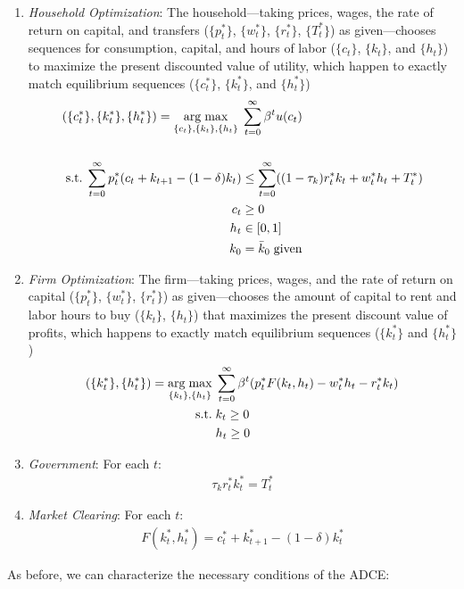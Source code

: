 \documentclass[12pt]{article}
\theoremstyle{plain}
\theoremstyle{definition}
\theoremstyle{remark}
\DeclareMathOperator*{\argmax}{arg\;max}
\newcommand{\sumtinfz}{\sum^\infty_{t=0}}
\begin{document}
\begin{enumerate}
  \item \emph{Household Optimization}: The household---taking prices,
    wages, the rate of return on capital, and transfers
    ($\{p^*_t\}$, $\{w^*_t\}$, $\{r^*_t\}$, $\{T_t^*\}$) as
    given---chooses sequences for consumption, capital, and hours of
    labor
    ($\{c_t\}$, $\{k_t\}$, and $\{h_t\}$)
    to maximize the present discounted value of utility, which happen to
    exactly match equilibrium sequences
    ($\{c_t^*\}$, $\{k_t^*\}$, and $\{h_t^*\}$)
    \begin{align}
      (\{c_t^*\}, \{k_t^*\}, \{h_t^*\})
      =
      \argmax_{\{c_t\}, \{k_t\}, \{h_t\}}
        \; &\sumtinfz \beta^t u(c_t)
        \label{defn:adce-hh-objfcn-taxes}\\\notag\\
      \text{s.t.} \;
        \sumtinfz p^*_t(c_t + k_{t+1}-(1-\delta)k_t) &\leq
        \sumtinfz ((1-\tau_k)r^*_t k_t + w^*_t h_t + T^*_t)
        \label{defn:adce-hh-budget-taxes}\\
      c_t &\geq 0 \notag\\
      h_t &\in [0,1] \notag\\
      k_0 &= \bar{k}_0 \; \text{given} \notag
    \end{align}

  \item \emph{Firm Optimization}: The firm---taking
    prices, wages, and the rate of return on capital
    ($\{p^*_t\}$, $\{w^*_t\}$, $\{r^*_t\}$) as given---chooses
    the amount of capital to rent and labor hours to buy
    ($\{k_t\}$, $\{h_t\}$)
    that maximizes the present discount value of profits, which happens
    to exactly match equilibrium sequences
    ($\{k_t^*\}$ and $\{h_t^*\}$)
    \begin{align}
      (\{k_t^*\}, \{h_t^*\})
      =
      \argmax_{\{k_t\}, \{h_t\}}
        \; &\sumtinfz \beta^t (p^*_t F(k_t,h_t) - w^*_t h_t - r^*_t k_t)
        \label{defn:adce-firm-objfcn-taxes}\\
      \text{s.t.} \;
      &k_t \geq 0 \notag\\
      &h_t \geq 0 \notag
    \end{align}

  \item \emph{Government}: For each $t$:
    \begin{align}
      \tau_k r^*_t k^*_t = T^*_t
      \label{taxes-govt}
    \end{align}

  \item \emph{Market Clearing}: For each $t$:
    \begin{align}
      F(k^*_t,h_t^*) = c_t^* + k^*_{t+1} - (1-\delta)k_t^*
      \label{taxes-clear}
    \end{align}
\end{enumerate}
As before, we can characterize the necessary conditions of the ADCE:
\end{document}
